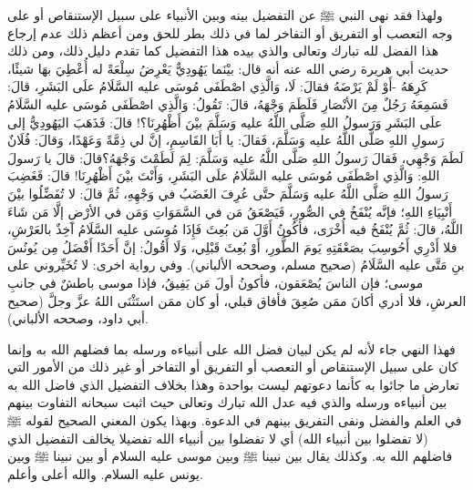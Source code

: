 ولهذا فقد نهى النبي ﷺ عن التفضيل بينه وبين الأنبياء على سبيل الإستنقاص أو على وجه التعصب أو التفريق أو التفاخر لما في ذلك بطر للحق ومن أعظم ذلك عدم إرجاع هذا الفضل لله تبارك وتعالى والذي بيده هذا التفضيل كما تقدم دليل ذلك، ومن ذلك حديث أبي هريرة رضي الله عنه أنه قال: بيْنَما يَهُودِيٌّ يَعْرِضُ سِلْعَةً له أُعْطِيَ بهَا شيئًا، كَرِهَهُ -أَوْ لَمْ يَرْضَهُ فقالَ: لَا، وَالَّذِي اصْطَفَى مُوسَى عليه السَّلَامُ علَى البَشَرِ، قالَ: فَسَمِعَهُ رَجُلٌ مِنَ الأنْصَارِ فَلَطَمَ وَجْهَهُ، قالَ: تَقُولُ: وَالَّذِي اصْطَفَى مُوسَى عليه السَّلَامُ علَى البَشَرِ وَرَسولُ اللهِ صَلَّى اللَّهُ عليه وَسَلَّمَ بيْنَ أَظْهُرِنَا؟! قالَ: فَذَهَبَ اليَهُودِيُّ إلى رَسولِ اللهِ صَلَّى اللَّهُ عليه وَسَلَّمَ، فَقالَ: يا أَبَا القَاسِمِ، إنَّ لي ذِمَّةً وَعَهْدًا، وَقالَ: فُلَانٌ لَطَمَ وَجْهِي، فَقالَ رَسولُ اللهِ صَلَّى اللَّهُ عليه وَسَلَّمَ: لِمَ لَطَمْتَ وَجْهَهُ؟قالَ: قالَ يا رَسولَ اللهِ: وَالَّذِي اصْطَفَى مُوسَى عليه السَّلَامُ علَى البَشَرِ، وَأَنْتَ بيْنَ أَظْهُرِنَا! قالَ: فَغَضِبَ رَسولُ اللهِ صَلَّى اللَّهُ عليه وَسَلَّمَ حتَّى عُرِفَ الغَضَبُ في وَجْهِهِ، ثُمَّ قالَ: لا تُفَضِّلُوا بيْنَ أَنْبِيَاءِ اللهِ؛ فإنَّه يُنْفَخُ في الصُّورِ، فَيَصْعَقُ مَن في السَّمَوَاتِ وَمَن في الأرْضِ إلَّا مَن شَاءَ اللَّهُ، قالَ: ثُمَّ يُنْفَخُ فيه أُخْرَى، فأكُونُ أَوَّلَ مَن بُعِثَ فَإِذَا مُوسَى عليه السَّلَامُ آخِذٌ بالعَرْشِ، فلا أَدْرِي أَحُوسِبَ بصَعْقَتِهِ يَومَ الطُّورِ، أَوْ بُعِثَ قَبْلِي، وَلَا أَقُولُ: إنَّ أَحَدًا أَفْضَلُ مِن يُونُسَ بنِ مَتَّى عليه السَّلَامُ {\footnotesize (صحيح مسلم، وصححه الألباني)}. وفي رواية اخرى: لا تُخَيِّروني على موسى؛ فإن الناسَ يُصْعَقون، فأكونُ أولَ مَن يَفِيقُ، فإذا موسى باطشٌ في جانبِ العرشِ، فلا أدري أكانَ ممَن صُعِقَ فأفاق قبلي، أو كان ممَن استَثْنَى اللهُ عزَّ وجلَّ {\footnotesize (صحيح أبي داود، وصححه الألباني)}. 

فهذا النهي جاء لأنه لم يكن لبيان فضل الله على أنبياءه ورسله بما فضلهم الله به وإنما كان على سبيل الإستنقاص أو التعصب أو التفريق أو التفاخر أو غير ذلك من الأمور التي تعارض ما جائوا به كأنما دعوتهم ليست بواحدة وهذا بخلاف التفضيل الذي فاضل الله به بين أنبياءه ورسله والذي فيه عدل الله تبارك وتعالى حيث اثبت سبحانه التفاوت بينهم في العلم والفضل ونفى التفريق بينهم في الدعوة. وبهذا يكون المعني الصحيح لقوله ﷺ (لا تفضلوا بين أنبياء الله) أي لا تفضلوا بين أنبياء الله تفضيلا يخالف التفضيل الذي فاضلهم الله به. وكذلك يقال بين نبينا ﷺ وبين موسى عليه السلام أو بين نبينا ﷺ وبين يونس عليه السلام. والله أعلى وأعلم.

